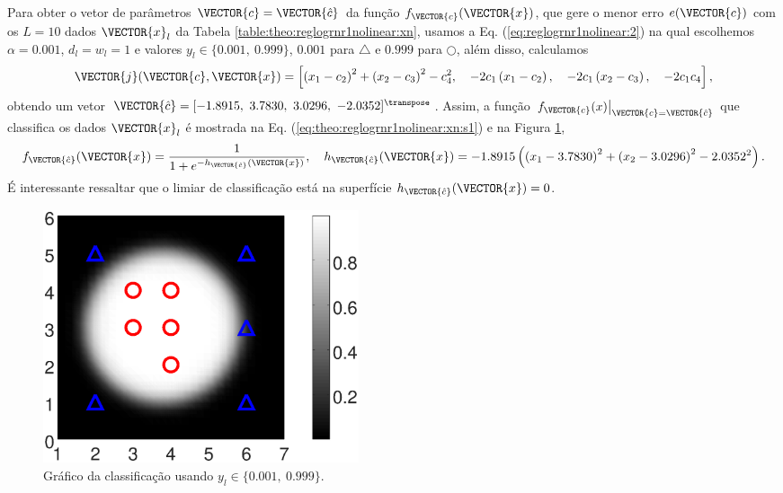 \begin{SolutionT}\label{sol:theo:reglogrnr1nolinear:s1}
Para obter o vetor de parâmetros $\VECTOR{c}=\VECTOR{\hat{c}}$ da função $f_{\VECTOR{c}}(\VECTOR{x})$, 
que gere o menor erro $e(\VECTOR{c})$
com os $L=10$ dados $\VECTOR{x}_l$ da Tabela \ref{table:theo:reglogrnr1nolinear:xn},
usamos a Eq. (\ref{eq:reglogrnr1nolinear:2}) na qual escolhemos $\alpha=0.001$, $d_l=w_l=1$ e valores $y_l \in \{0.001,~ 0.999\}$,
$0.001$ para $\bigtriangleup$ e $0.999$ para $\bigcirc$,
além disso, calculamos 
\begin{equation}
\VECTOR{j}(\VECTOR{c},\VECTOR{x}) = 
\left[ 
\left(x_1-c_2\right)^2 + \left(x_2-c_3\right)^2 -c_4^2, \quad 
-2c_1\left(x_1-c_2\right), \quad
-2c_1\left(x_2-c_3\right), \quad
-2c_1c_4
\right],
\end{equation}
obtendo um vetor $\VECTOR{\hat{c}}=[-1.8915,~ 3.7830,~ 3.0296,~ -2.0352]^{\transpose}$.
Assim, a função $\left.f_{\VECTOR{c}}(x)\right|_{\VECTOR{c}=\VECTOR{\hat{c}}}$ que classifica os dados $\VECTOR{x}_l$
é mostrada na Eq. (\ref{eq:theo:reglogrnr1nolinear:xn:s1}) e na Figura \ref{fig:theo:reglogrnr1nolinear:xn:s1},
\begin{equation}\label{eq:theo:reglogrnr1nolinear:xn:s1}
f_{\VECTOR{\hat{c}}}(\VECTOR{x})= \frac{1}{1+e^{-h_{\VECTOR{\hat{c}}}(\VECTOR{x})}},
\quad
h_{\VECTOR{\hat{c}}}(\VECTOR{x}) = -1.8915\left( \left(x_1-3.7830\right)^2 + \left(x_2-3.0296\right)^2 -2.0352^2\right).\\
\end{equation}
É interessante ressaltar que o limiar de classificação está na superfície $h_{\VECTOR{\hat{c}}}(\VECTOR{x})=0$.
\end{SolutionT}
\begin{figure}[!h]
        \centering
        \includegraphics[width=0.45\textwidth]{chapters/classificacao/mfiles/reglogrnr1nolinear/ex1s2-reglogrnr1nolinear.eps}
        \caption{Gráfico da classificação usando $y_l \in \{0.001,~ 0.999\}$.}
        \label{fig:theo:reglogrnr1nolinear:xn:s1}
\end{figure}



